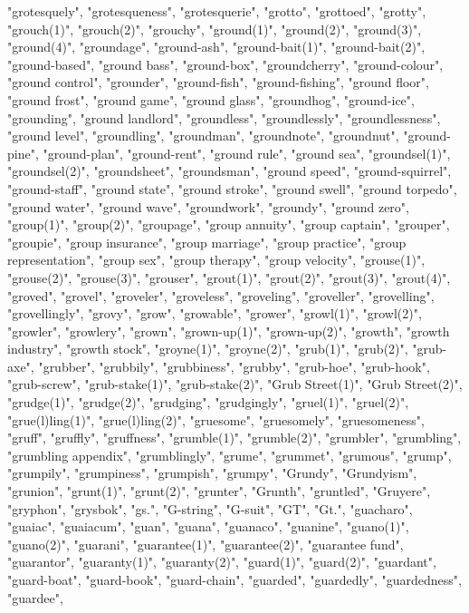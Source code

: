 "grotesquely",
"grotesqueness",
"grotesquerie",
"grotto",
"grottoed",
"grotty",
"grouch(1)",
"grouch(2)",
"grouchy",
"ground(1)",
"ground(2)",
"ground(3)",
"ground(4)",
"groundage",
"ground-ash",
"ground-bait(1)",
"ground-bait(2)",
"ground-based",
"ground bass",
"ground-box",
"groundcherry",
"ground-colour",
"ground control",
"grounder",
"ground-fish",
"ground-fishing",
"ground floor",
"ground frost",
"ground game",
"ground glass",
"groundhog",
"ground-ice",
"grounding",
"ground landlord",
"groundless",
"groundlessly",
"groundlessness",
"ground level",
"groundling",
"groundman",
"groundnote",
"groundnut",
"ground-pine",
"ground-plan",
"ground-rent",
"ground rule",
"ground sea",
"groundsel(1)",
"groundsel(2)",
"groundsheet",
"groundsman",
"ground speed",
"ground-squirrel",
"ground-staff",
"ground state",
"ground stroke",
"ground swell",
"ground torpedo",
"ground water",
"ground wave",
"groundwork",
"groundy",
"ground zero",
"group(1)",
"group(2)",
"groupage",
"group annuity",
"group captain",
"grouper",
"groupie",
"group insurance",
"group marriage",
"group practice",
"group representation",
"group sex",
"group therapy",
"group velocity",
"grouse(1)",
"grouse(2)",
"grouse(3)",
"grouser",
"grout(1)",
"grout(2)",
"grout(3)",
"grout(4)",
"groved",
"grovel",
"groveler",
"groveless",
"groveling",
"groveller",
"grovelling",
"grovellingly",
"grovy",
"grow",
"growable",
"grower",
"growl(1)",
"growl(2)",
"growler",
"growlery",
"grown",
"grown-up(1)",
"grown-up(2)",
"growth",
"growth industry",
"growth stock",
"groyne(1)",
"groyne(2)",
"grub(1)",
"grub(2)",
"grub-axe",
"grubber",
"grubbily",
"grubbiness",
"grubby",
"grub-hoe",
"grub-hook",
"grub-screw",
"grub-stake(1)",
"grub-stake(2)",
"Grub Street(1)",
"Grub Street(2)",
"grudge(1)",
"grudge(2)",
"grudging",
"grudgingly",
"gruel(1)",
"gruel(2)",
"grue(l)ling(1)",
"grue(l)ling(2)",
"gruesome",
"gruesomely",
"gruesomeness",
"gruff",
"gruffly",
"gruffness",
"grumble(1)",
"grumble(2)",
"grumbler",
"grumbling",
"grumbling appendix",
"grumblingly",
"grume",
"grummet",
"grumous",
"grump",
"grumpily",
"grumpiness",
"grumpish",
"grumpy",
"Grundy",
"Grundyism",
"grunion",
"grunt(1)",
"grunt(2)",
"grunter",
"Grunth",
"gruntled",
"Gruyere",
"gryphon",
"grysbok",
"gs.",
"G-string",
"G-suit",
"GT",
"Gt.",
"guacharo",
"guaiac",
"guaiacum",
"guan",
"guana",
"guanaco",
"guanine",
"guano(1)",
"guano(2)",
"guarani",
"guarantee(1)",
"guarantee(2)",
"guarantee fund",
"guarantor",
"guaranty(1)",
"guaranty(2)",
"guard(1)",
"guard(2)",
"guardant",
"guard-boat",
"guard-book",
"guard-chain",
"guarded",
"guardedly",
"guardedness",
"guardee",
